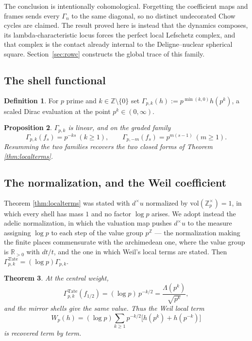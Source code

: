 \documentclass[11pt]{amsart}
\newtheorem{theorem}{Theorem}[section]
\newtheorem{proposition}[theorem]{Proposition}
\theoremstyle{definition}
\newtheorem{definition}[theorem]{Definition}
\theoremstyle{remark}
\newcommand{\R}{\mathbb R}
\newcommand{\Z}{\mathbb Z}
\begin{document}
The conclusion is intentionally cohomological.  Forgetting the coefficient
maps and frames sends every $\Gamma_n$ to the same diagonal, so no distinct
undecorated Chow cycles are claimed.  The result proved here is instead
that the dynamics composes, its lambda-characteristic locus forces the perfect local
Lefschetz complex, and that complex is the contact already internal to the
Deligne--nuclear spherical square.  Section~\ref{sec:rowc} constructs the
global trace of this family.



\subsection{The shell functional}

\begin{definition}
For $p$ prime and $k\in\Z\setminus\{0\}$ set
$\Gamma_{p,k}(h):=p^{\min(k,0)}h(p^{k})$, a scaled Dirac evaluation at the
point $p^{k}\in(0,\infty)$.
\end{definition}

\begin{proposition}\label{prop:pairing3}
$\Gamma_{p,k}$ is linear, and on the graded family
\[
 \Gamma_{p,k}(f_s)=p^{-ks}\ (k\ge1),
 \qquad
 \Gamma_{p,-m}(f_s)=p^{m(s-1)}\ (m\ge1).
\]
Resumming the two families recovers the two closed forms of Theorem
\ref{thm:localterms}.
\end{proposition}

\subsection{The normalization, and the Weil coefficient}

Theorem \ref{thm:localterms} was stated with $d^\times u$ normalized by
$\mathrm{vol}(\Z_p^\times)=1$, in which every shell has mass $1$ and no
factor $\log p$ arises.  We adopt instead the adelic normalization, in which
the valuation map pushes $d^\times u$ to the measure assigning $\log p$ to
each step of the value group $p^{\Z}$ --- the normalization making the finite
places commensurate with the archimedean one, where the value group is
$\R_{>0}$ with $dt/t$, and the one in which Weil's local terms are stated.
Then $\Gamma^{\mathrm{Tate}}_{p,k}=(\log p)\Gamma_{p,k}$.

\begin{theorem}\label{thm:weilcoeff}
At the central weight,
\[
 \Gamma^{\mathrm{Tate}}_{p,k}(f_{1/2})=(\log p)\,p^{-k/2}
 =\frac{\Lambda(p^{k})}{\sqrt{p^{k}}},
\]
and the mirror shells give the same value.  Thus the Weil local term
\[
 W_p(h)=(\log p)\sum_{k\ge1}p^{-k/2}
 \bigl[h(p^{k})+h(p^{-k})\bigr]
\]
is recovered term by term.
\end{theorem}
\end{document}
